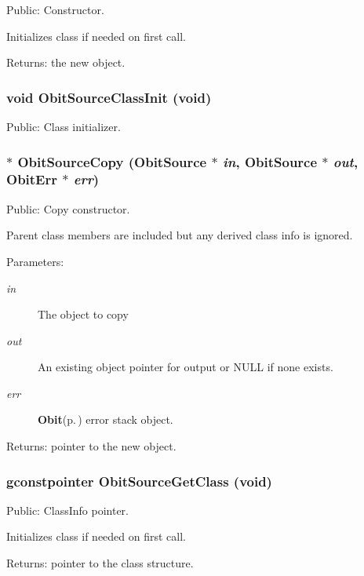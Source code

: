 Public: Constructor. 

Initializes class if needed on first call. \begin{Desc}
\item[Returns:]the new object. \end{Desc}
\subsubsection{\setlength{\rightskip}{0pt plus 5cm}void Obit\-Source\-Class\-Init (void)}\label{ObitSource_8h_a3}


Public: Class initializer. 

\subsubsection{$\ast$ Obit\-Source\-Copy ({\bf Obit\-Source} $\ast$ {\em in}, {\bf Obit\-Source} $\ast$ {\em out}, {\bf Obit\-Err} $\ast$ {\em err})}\label{ObitSource_8h_a6}


Public: Copy constructor. 

Parent class members are included but any derived class info is ignored. \begin{Desc}
\item[Parameters:]
\begin{description}
\item[{\em in}]The object to copy \item[{\em out}]An existing object pointer for output or NULL if none exists. \item[{\em err}]{\bf Obit}{\rm (p.\,\pageref{structObit})} error stack object. \end{description}
\end{Desc}
\begin{Desc}
\item[Returns:]pointer to the new object. \end{Desc}
\subsubsection{\setlength{\rightskip}{0pt plus 5cm}gconstpointer Obit\-Source\-Get\-Class (void)}\label{ObitSource_8h_a5}


Public: Class\-Info pointer. 

Initializes class if needed on first call. \begin{Desc}
\item[Returns:]pointer to the class structure. \end{Desc}
